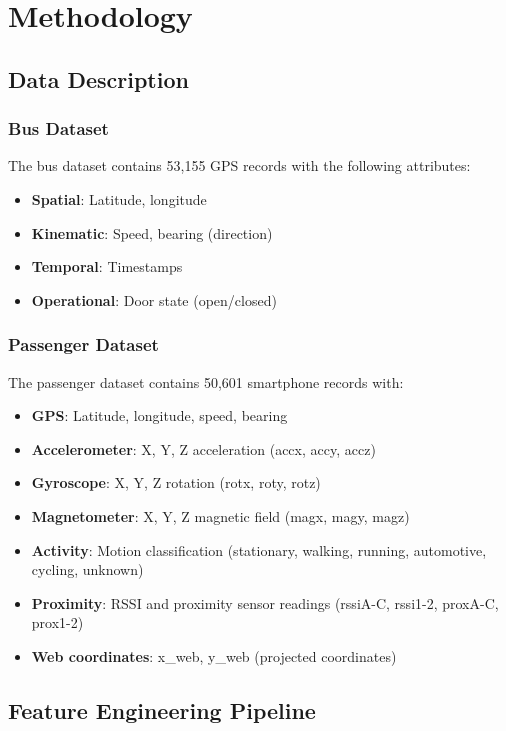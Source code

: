 \section{Methodology}

\subsection{Data Description}

\subsubsection{Bus Dataset}
The bus dataset contains 53,155 GPS records with the following attributes:
\begin{itemize}
    \item \textbf{Spatial}: Latitude, longitude
    \item \textbf{Kinematic}: Speed, bearing (direction)
    \item \textbf{Temporal}: Timestamps
    \item \textbf{Operational}: Door state (open/closed)
\end{itemize}

\subsubsection{Passenger Dataset}
The passenger dataset contains 50,601 smartphone records with:
\begin{itemize}
    \item \textbf{GPS}: Latitude, longitude, speed, bearing
    \item \textbf{Accelerometer}: X, Y, Z acceleration (accx, accy, accz)
    \item \textbf{Gyroscope}: X, Y, Z rotation (rotx, roty, rotz)
    \item \textbf{Magnetometer}: X, Y, Z magnetic field (magx, magy, magz)
    \item \textbf{Activity}: Motion classification (stationary, walking, running, automotive, cycling, unknown)
    \item \textbf{Proximity}: RSSI and proximity sensor readings (rssiA-C, rssi1-2, proxA-C, prox1-2)
    \item \textbf{Web coordinates}: x\_web, y\_web (projected coordinates)
\end{itemize}

\subsection{Feature Engineering Pipeline}

